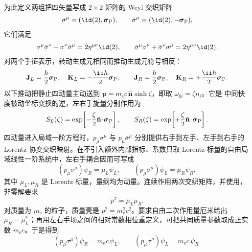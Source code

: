 为此定义两组把四矢量写成 $2\times2$ 矩阵的 Weyl 交织矩阵
\begin{equation*}
 \sigma^\mu=(\id(2),\boldsymbol\sigma_{\rm P}),
 \qquad
 \bar\sigma^\mu=(\id(2),-\boldsymbol\sigma_{\rm P}),
\end{equation*}
它们满足
\begin{equation}
 \sigma^\mu\bar\sigma^\nu+\sigma^\nu\bar\sigma^\mu
 =2\eta^{\mu\nu}\id(2),
 \qquad
 \bar\sigma^\mu\sigma^\nu+\bar\sigma^\nu\sigma^\mu
 =2\eta^{\mu\nu}\id(2).
 \label{eq:sigmabar-identity}
\end{equation}
对两个手征表示，转动生成元相同而推动生成元符号相反：
\begin{equation}
 \mathbf J_L=\frac{\hbar}{2}\boldsymbol\sigma_{\rm P},
 \quad
 \mathbf K_L=-\frac{\ii\hbar}{2}\boldsymbol\sigma_{\rm P},
 \qquad
 \mathbf J_R=\frac{\hbar}{2}\boldsymbol\sigma_{\rm P},
 \quad
 \mathbf K_R=+\frac{\ii\hbar}{2}\boldsymbol\sigma_{\rm P}.
 \label{eq:weyl-generators}
\end{equation}
以下推动把静止四动量主动送到 $\mathbf p=m_{\mathrm e}c\,\hat{\mathbf n}\sinh\zeta$，即取 $\omega_{0i}=\zeta n_i$。它是 中同快度被动坐标变换的逆，左右手旋量分别作用为
\begin{equation}
 S_L(\zeta)=\exp\!\left[-\frac{\zeta}{2}
 \hat{\mathbf n}\!\cdot\!\boldsymbol\sigma_{\rm P}\right],
 \qquad
 S_R(\zeta)=\exp\!\left[+\frac{\zeta}{2}
 \hat{\mathbf n}\!\cdot\!\boldsymbol\sigma_{\rm P}\right].
 \label{eq:weyl-boost-r7}
\end{equation}
四动量进入局域一阶方程时，$p_\mu\sigma^\mu$ 与 $p_\mu\bar\sigma^\mu$ 分别提供右手到左手、左手到右手的 Lorentz 协变交织映射。在不引入额外内部指标、系数只取 Lorentz 标量的自由局域线性一阶系统中，左右手耦合因而可写成
\begin{equation*}
 (p_\mu\sigma^\mu)\psi_R=\mu_L\psi_L,
 \qquad
 (p_\mu\bar\sigma^\mu)\psi_L=\mu_R\psi_R,
\end{equation*}
其中 $\mu_L,\mu_R$ 是 Lorentz 标量，量纲均为动量。连续作用两次交织矩阵，并使用，非零解要求
\begin{equation*}
 p^2=\mu_L\mu_R.
\end{equation*}
对质量为 $m_{\mathrm e}$ 的粒子，质量壳是 $p^2=m_{\mathrm e}^2c^2$。要求自由二次作用量厄米给出 $\mu_R=\mu_L^*$；再用左右手场之间的相对常数相位重定义，可把共同质量参数取成正实数 $m_{\mathrm e} c$。于是得到
\begin{equation}
 \boxed{
 (p_\mu\sigma^\mu)\psi_R=m_{\mathrm e} c\,\psi_L,
 \qquad
 (p_\mu\bar\sigma^\mu)\psi_L=m_{\mathrm e} c\,\psi_R.}
 \label{eq:massive-weyl-coupled-r7}
\end{equation}
